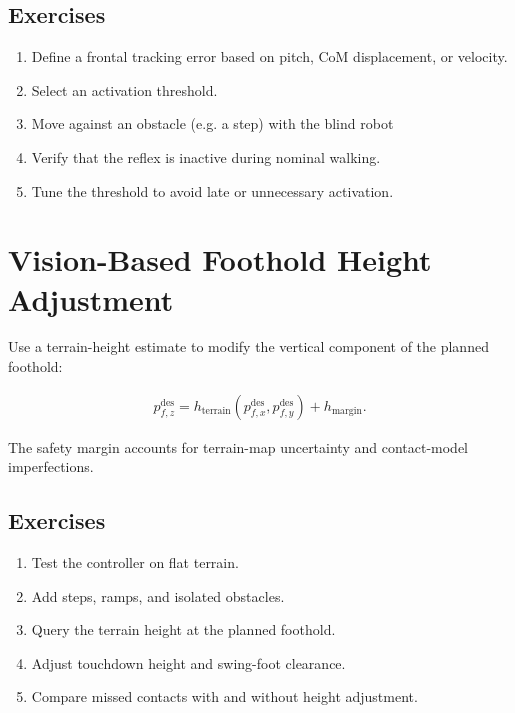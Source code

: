 \documentclass[11pt,a4paper]{article}
\begin{document}
\subsection*{Exercises}

\begin{enumerate}[label=\arabic*.]
    \item Define a frontal tracking error based on pitch, CoM displacement, or velocity.
    \item Select an activation threshold.
    \item Move against an obstacle (e.g. a step) with the blind robot
    \item Verify that the reflex is inactive during nominal walking.
    \item Tune the threshold to avoid late or unnecessary activation.
\end{enumerate}

\section{Vision-Based Foothold Height Adjustment}

Use a terrain-height estimate to modify the vertical component of the planned foothold:

\begin{align*}
p_{f,z}^{\mathrm{des}} =
h_{\mathrm{terrain}}
\left(
p_{f,x}^{\mathrm{des}},
p_{f,y}^{\mathrm{des}}
\right)
+
h_{\mathrm{margin}}.
\end{align*}

The safety margin accounts for terrain-map uncertainty and contact-model imperfections.

\subsection*{Exercises}

\begin{enumerate}[label=\arabic*.]
    \item Test the controller on flat terrain.
    \item Add steps, ramps, and isolated obstacles.
    \item Query the terrain height at the planned foothold.
    \item Adjust touchdown height and swing-foot clearance.
    \item Compare missed contacts with and without height adjustment.
\end{enumerate}
\end{document}
